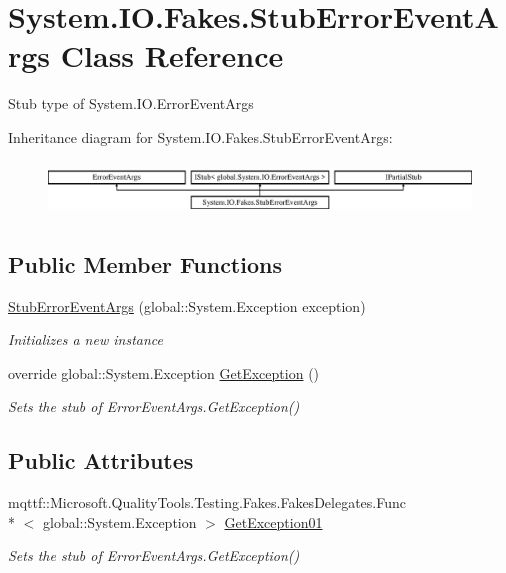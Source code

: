 \hypertarget{class_system_1_1_i_o_1_1_fakes_1_1_stub_error_event_args}{\section{System.\-I\-O.\-Fakes.\-Stub\-Error\-Event\-Args Class Reference}
\label{class_system_1_1_i_o_1_1_fakes_1_1_stub_error_event_args}
}


Stub type of System.\-I\-O.\-Error\-Event\-Args 


Inheritance diagram for System.\-I\-O.\-Fakes.\-Stub\-Error\-Event\-Args\-:\begin{figure}[H]
\begin{center}
\leavevmode
\includegraphics[height=1.435897cm]{class_system_1_1_i_o_1_1_fakes_1_1_stub_error_event_args}
\end{center}
\end{figure}
\subsection*{Public Member Functions}
\begin{DoxyCompactItemize}
\item 
\hyperlink{class_system_1_1_i_o_1_1_fakes_1_1_stub_error_event_args_af1039338eb938d5e54d0d33596d5093b}{Stub\-Error\-Event\-Args} (global\-::\-System.\-Exception exception)
\begin{DoxyCompactList}\small\item\em Initializes a new instance\end{DoxyCompactList}\item 
override global\-::\-System.\-Exception \hyperlink{class_system_1_1_i_o_1_1_fakes_1_1_stub_error_event_args_affa0c9dd1327d8380dae333d40548a80}{Get\-Exception} ()
\begin{DoxyCompactList}\small\item\em Sets the stub of Error\-Event\-Args.\-Get\-Exception()\end{DoxyCompactList}\end{DoxyCompactItemize}
\subsection*{Public Attributes}
\begin{DoxyCompactItemize}
\item 
mqttf\-::\-Microsoft.\-Quality\-Tools.\-Testing.\-Fakes.\-Fakes\-Delegates.\-Func\\*
$<$ global\-::\-System.\-Exception $>$ \hyperlink{class_system_1_1_i_o_1_1_fakes_1_1_stub_error_event_args_af5160f26a54a539e3e3a8c2e3a5c7bac}{Get\-Exception01}
\begin{DoxyCompactList}\small\item\em Sets the stub of Error\-Event\-Args.\-Get\-Exception()\end{DoxyCompactList}\end{DoxyCompactItemize}
